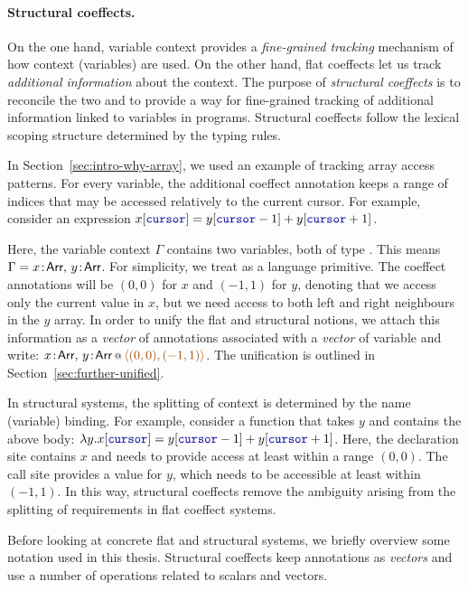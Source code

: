 \paragraph{Structural coeffects.}
On the one hand, variable context provides a \emph{fine-grained tracking} mechanism of how context
(variables) are used. On the other hand, flat coeffects let us track \emph{additional information} about
the context. The purpose of \emph{structural coeffects} is to reconcile the two and to provide a way
for fine-grained tracking of additional information linked to variables in programs. Structural
coeffects follow the lexical scoping structure determined by the typing rules.

In Section~\ref{sec:intro-why-array}, we used an example of tracking array access patterns. For every
variable, the additional coeffect annotation keeps a range of indices that may be accessed relatively
to the current cursor. For example, consider an expression
$x[\kvd{cursor}] = y[\kvd{cursor}-1] + y[\kvd{cursor}+1]$.

Here, the variable context $\Gamma$ contains two variables, both of type . This means
$\Gamma = x\!:\!\ident{Arr},\, y\!:\!\ident{Arr}$. For simplicity, we treat  as a
language primitive. The coeffect annotations will be $(0,0)$ for $x$ and $(-1,1)$ for $y$,
denoting that we access only the current value in $x$, but we need access to both left and right
neighbours in the $y$ array. In order to unify the flat and structural notions, we attach this information
as a \emph{vector} of annotations associated with a \emph{vector} of variable and write:
$\coctx{x\!:\!\ident{Arr},\, y\!:\!\ident{Arr}}{ \aclrd{\alift{ (0,0), (-1,1) }} }$.
The unification is outlined in Section~\ref{sec:further-unified}.

In structural systems, the splitting of context is determined by the name (variable) binding.
For example, consider a function that takes $y$ and contains the above body:
$\lambda y.x[\kvd{cursor}] = y[\kvd{cursor}-1] + y[\kvd{cursor}+1]$. Here, the declaration site
contains $x$ and needs to provide access at least within a range $(0,0)$. The call site provides
a value for $y$, which needs to be accessible at least within $(-1, 1)$. In this way, structural
coeffects remove the ambiguity arising from the splitting of requirements in flat coeffect systems.

Before looking at concrete flat and structural systems, we briefly overview
some notation used in this thesis. Structural coeffects keep annotations as \emph{vectors} and
use a number of operations related to scalars and vectors.

